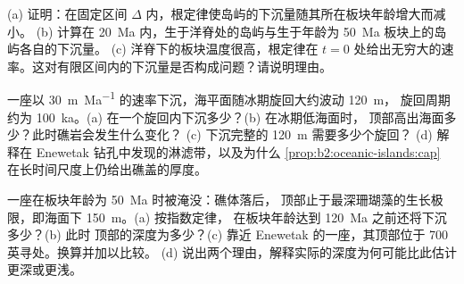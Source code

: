 \begin{exercise}[$\star\star\star$]\label{exo:b2:oceanic-islands:10}
(a) 证明：在固定区间 $\Delta$ 内，根定律使岛屿的下沉量随其所在板块年龄增大而减小。
(b) 计算在 \qty{20}{Ma} 内，生于洋脊处的岛屿与生于年龄为 \qty{50}{Ma} 板块上的岛屿各自的下沉量。
(c) 洋脊下的板块温度很高，根定律在
$t = 0$ 处给出无穷大的速率。这对有限区间内的下沉量是否构成问题？请说明理由。
\end{exercise}

\begin{exercise}[$\star\star\star$]\label{exo:b2:oceanic-islands:11}
一座以 \qty{30}{m.Ma^{-1}} 的速率下沉，海平面随冰期旋回大约波动 \qty{120}{m}，
旋回周期约为 \qty{100}{ka}。(a) 在一个旋回内下沉多少？(b) 在冰期低海面时，
顶部高出海面多少？此时礁岩会发生什么变化？
(c) 下沉完整的 \qty{120}{m} 需要多少个旋回？
(d) 解释在 Enewetak 钻孔中发现的淋滤带，以及为什么
\cref{prop:b2:oceanic-islands:cap} 在长时间尺度上仍给出礁盖的厚度。
\end{exercise}

\begin{exercise}[$\star\star\star$]\label{exo:b2:oceanic-islands:12}
一座在板块年龄为 \qty{50}{Ma} 时被淹没：礁体落后，
顶部止于最深珊瑚藻的生长极限，即海面下 \qty{150}{m}。(a) 按指数定律，
在板块年龄达到 \qty{120}{Ma} 之前还将下沉多少？(b) 此时
顶部的深度为多少？(c) 靠近 Enewetak 的一座，其顶部位于 700 英寻处。换算并加以比较。
(d) 说出两个理由，解释实际的深度为何可能比此估计更深或更浅。
\end{exercise}

